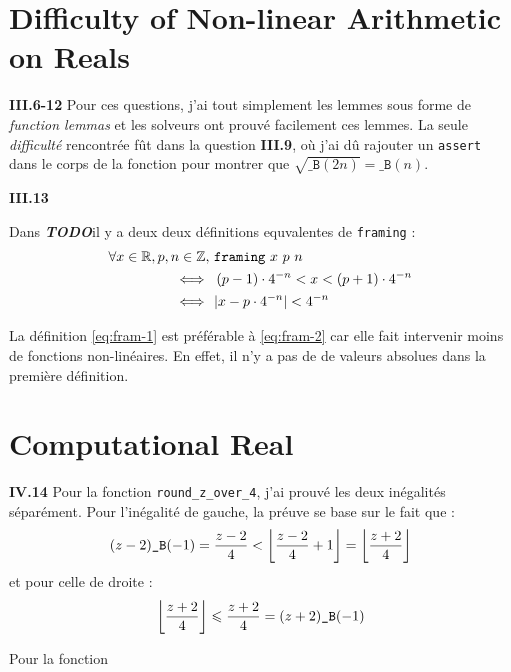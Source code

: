 \documentclass[9pt,a4paper,twocolumn]{article}
\theoremstyle{definition}
\DeclarePairedDelimiter\floor{\lfloor}{\rfloor}
\newcommand{\Z}{\ensuremath\mathbb{Z}}
\newcommand{\R}{\ensuremath\mathbb{R}}
\newcommand{\B}{\texttt{\_B}}
\renewcommand{\leq}{\leqslant}
\newcommand{\TODO}{{\color{red}\textbf{\textit{TODO}}}}
\begin{document}
\section{Difficulty of Non-linear Arithmetic on Reals}

\textbf{III.6-12}
Pour ces questions, j'ai tout simplement les lemmes sous forme de
\textit{function lemmas} et les solveurs ont prouvé facilement ces lemmes.
La seule \textit{difficulté} rencontrée fût dans la question \textbf{III.9},
où j'ai dû rajouter un \texttt{assert} dans le corps de la fonction pour
montrer que $\sqrt{\B(2n)} = \B(n)$.

\textbf{III.13}

Dans \TODO il y a deux deux définitions equvalentes de \texttt{framing} :
\begin{align}
\forall x \in \R, p, n \in \Z,\  \nonumber
	& \texttt{framing}\ x\ p\ n \\
\Longleftrightarrow \ \
	& \left( p-1 \right) \cdot 4^{-n}
		< x <
		\left( p+1 \right) \cdot 4^{-n}
	\label{eq:fram-1} \\
\Longleftrightarrow \ \
	& |x-p\cdot 4^{-n}| < 4^{-n}
	\label{eq:fram-2}
\end{align}

La définition \ref{eq:fram-1} est préférable à \ref{eq:fram-2} car elle fait
intervenir moins de fonctions non-linéaires.
En effet, il n'y a pas de de valeurs absolues dans la première définition.

\section{Computational Real}

\textbf{IV.14}
Pour la fonction \texttt{round\_z\_over\_4}, j'ai prouvé les deux inégalités
séparément. Pour l'inégalité de gauche, la préuve se  base sur le fait que :
$$
	(z-2)\B(-1)
	= \frac{z-2}{4}
	< \floor*{ \frac{z - 2}{4} + 1 }
	= \floor*{ \frac{z+2}{4} }
$$
et pour celle de droite :
$$
\floor*{ \frac{z + 2}{4} }
	\leq \frac{z+2}{4}
	= (z + 2)\B(-1)
$$

Pour la fonction








































\end{document}
